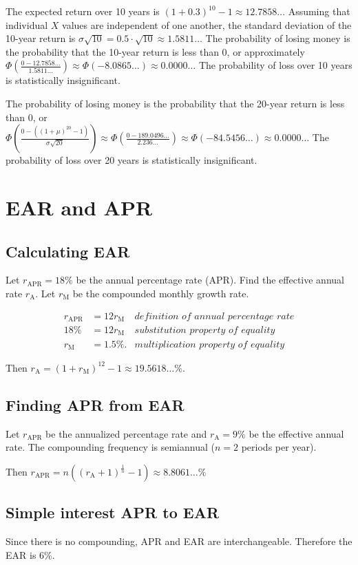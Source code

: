 \documentclass[12pt]{article}
\begin{document}
The expected return over 10 years is $(1+0.3)^{10}-1\approx 12.7858\dots$ Assuming that individual $X$ values are independent of one another, the standard deviation of the 10-year return is $\sigma\sqrt{10}=0.5\cdot\sqrt{10}\approx 1.5811\dots$ The probability of losing money is the probability that the 10-year return is less than 0, or approximately $\Phi\left(\frac{0-12.7858\dots}{1.5811\dots}\right)\approx\Phi(-8.0865\dots)\approx 0.0000\dots$ The probability of loss over 10 years is statistically insignificant.

The probability of losing money is the probability that the 20-year return is less than 0, or $\Phi\left(\frac{0-\left((1+\mu)^{20}-1\right)}{\sigma\sqrt{20}}\right)\approx\Phi\left(\frac{0-189.0496\dots}{2.236\dots}\right)\approx\Phi(-84.5456\dots)\approx 0.0000\dots$ The probability of loss over 20 years is statistically insignificant.
\section{EAR and APR}
\subsection{Calculating EAR}
Let $r_{\mathrm{APR}}=18\%$ be the annual percentage rate (APR). Find the effective annual rate $r_{\mathrm{A}}$. Let $r_{\mathrm{M}}$ be the compounded monthly growth rate.

\begin{align*}
r_{\mathrm{APR}}&=12r_{\mathrm{M}}&\textit{definition of annual percentage rate}\\
18\%&=12r_{\mathrm{M}}&\textit{substitution property of equality}\\
r_{\mathrm{M}}&=1.5\%.&\textit{multiplication property of equality}
\end{align*}

Then $r_{\mathrm{A}}=(1+r_{\mathrm{M}})^{12}-1\approx 19.5618\dots\%$.
\subsection{Finding APR from EAR}
Let $r_{\mathrm{APR}}$ be the annualized percentage rate and $r_{\mathrm{A}}=9\%$ be the effective annual rate. The compounding frequency is semiannual ($n=2$ periods per year).

Then $r_{\mathrm{APR}}=n\left((r_{\mathrm{A}}+1)^{\frac{1}{n}}-1\right)\approx 8.8061\dots\%$
\subsection{Simple interest APR to EAR}
Since there is no compounding, APR and EAR are interchangeable. Therefore the EAR is 6\%. 
\end{document}
